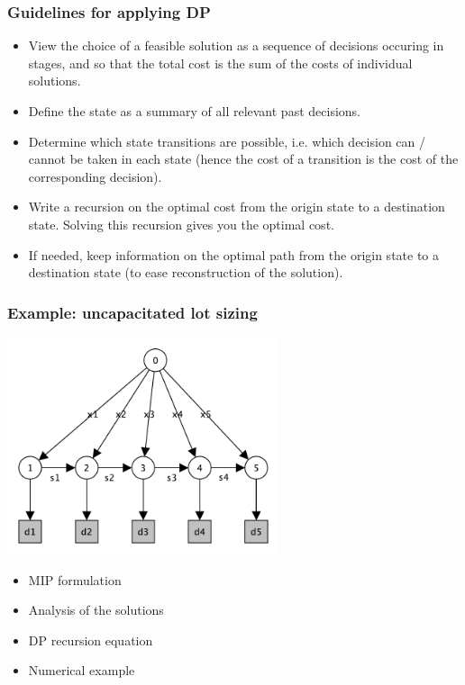 \documentclass[10pt,handout]{beamer}
\begin{document}
\begin{frame} \frametitle{Guidelines for applying DP}
  \begin{itemize}
  \item View the choice of a feasible solution as a sequence of
    decisions occuring in stages, and so that the total cost is the
    sum of the costs of individual solutions.
  \item Define the state as a summary of all relevant past decisions.
  \item Determine which state transitions are possible, i.e. which
    decision can / cannot be taken in each state (hence the cost
    of a transition is the cost of the corresponding decision).
  \item Write a recursion on the optimal cost from the origin state to
    a destination state. Solving this recursion gives you the optimal cost.
  \item If needed, keep information on the optimal path from the origin state to
    a destination state (to ease reconstruction of the solution).
  \end{itemize}
\end{frame}

\begin{frame}\frametitle{Example: uncapacitated lot sizing}
  \begin{center}
    \includegraphics[width=0.6\textwidth]{LotSizingNetwork.pdf}
  \end{center}

\begin{itemize}
\item MIP formulation
\item Analysis of the solutions
\item DP recursion equation
\item Numerical example 
\end{itemize}
\end{frame}
\end{document}
